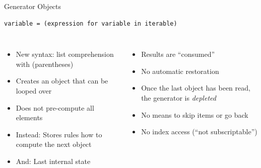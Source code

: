 \begin{frame}[fragile]{Generator Objects}
%
\begin{codebox}
\begin{verbatim}
variable = (expression for variable in iterable)
\end{verbatim}
\end{codebox}
%
\begin{columns}[T]
\begin{itemize}
\item New syntax: list comprehension with (parentheses)
\item Creates an object that can be looped over
\item Does not pre-compute all elements
\item Instead: Stores rules how to compute the next object
\item And: Last internal state
\end{itemize}
%
\begin{itemize}
\item Results are \enquote{consumed}
\item No automatic restoration
\item Once the last object has been read, the generator is \emph{depleted}
\item No means to skip items or go back
\item[\Thus] No index access (\enquote{not subscriptable})
\end{itemize}
\end{columns}
%
\end{frame}


